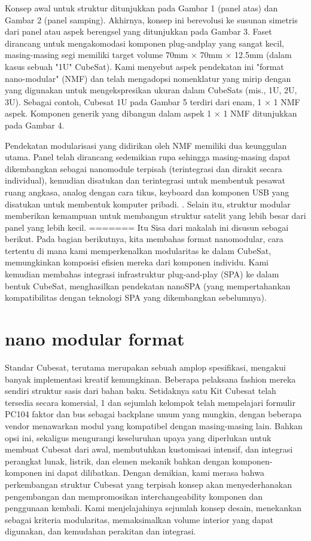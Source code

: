 Konsep awal untuk struktur ditunjukkan pada Gambar 1 (panel atas) dan Gambar 2 (panel samping). Akhirnya, konsep ini berevolusi ke susunan simetris dari panel atau aspek berengsel yang ditunjukkan pada Gambar 3. Faset dirancang untuk mengakomodasi komponen plug-andplay yang sangat kecil, masing-masing segi memiliki target volume 70mm × 70mm × 12.5mm (dalam kasus sebuah "1U" CubeSat). Kami menyebut aspek pendekatan ini "format nano-modular" (NMF) dan telah mengadopsi nomenklatur yang mirip dengan yang digunakan untuk mengekspresikan ukuran dalam CubeSats (mis., 1U, 2U, 3U). Sebagai contoh, Cubesat 1U pada Gambar 5 terdiri dari enam, 1 × 1 NMF aspek. Komponen generik yang dibangun dalam aspek 1 × 1 NMF ditunjukkan pada Gambar 4.

Pendekatan modularisasi yang didirikan oleh NMF memiliki dua keunggulan utama. Panel telah dirancang sedemikian rupa sehingga masing-masing dapat dikembangkan sebagai nanomodule terpisah (terintegrasi dan dirakit secara individual), kemudian disatukan dan terintegrasi untuk membentuk pesawat ruang angkasa, analog dengan cara tikus, keyboard dan komponen USB yang disatukan untuk membentuk komputer pribadi. . Selain itu, struktur modular memberikan kemampuan untuk membangun struktur satelit yang lebih besar dari panel yang lebih kecil.
=======
Itu Sisa dari makalah ini disusun sebagai berikut. Pada bagian berikutnya, kita membahas format nanomodular, cara tertentu di mana kami memperkenalkan modularitas ke dalam CubeSat, memungkinkan komposisi efisien mereka dari komponen individu. Kami kemudian membahas integrasi infrastruktur plug-and-play (SPA) ke dalam bentuk CubeSat, menghasilkan pendekatan nanoSPA (yang mempertahankan kompatibilitas dengan teknologi SPA yang dikembangkan sebelumnya). 

\section{nano modular format}
Standar Cubesat, terutama merupakan sebuah amplop spesifikasi, mengakui banyak implementasi kreatif kemungkinan. Beberapa pelaksana fashion mereka sendiri struktur sasis dari bahan baku. Setidaknya satu Kit Cubesat telah tersedia secara komersial, 1 dan sejumlah kelompok telah mempelajari formulir PC104 faktor dan bus sebagai backplane umum yang mungkin, dengan beberapa vendor menawarkan modul yang kompatibel dengan masing-masing lain. Bahkan opsi ini, sekaligus mengurangi keseluruhan upaya yang diperlukan untuk membuat Cubesat dari awal, membutuhkan kustomisasi intensif, dan integrasi perangkat lunak, listrik, dan elemen mekanik bahkan dengan komponen-komponen ini dapat dilibatkan. Dengan demikian, kami merasa bahwa perkembangan struktur Cubesat yang terpisah konsep akan menyederhanakan pengembangan dan mempromosikan interchangeability komponen dan penggunaan kembali. Kami menjelajahinya sejumlah konsep desain, menekankan sebagai kriteria modularitas, memaksimalkan volume interior yang dapat digunakan, dan kemudahan perakitan dan integrasi.

